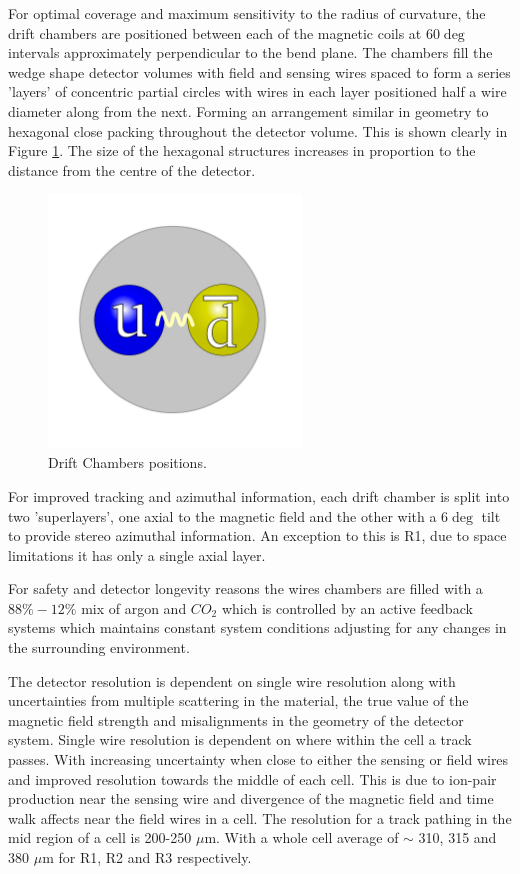 For optimal coverage and maximum sensitivity to the radius of curvature, the drift chambers are positioned between each of the magnetic coils at $60\deg$ intervals approximately perpendicular to the bend plane. The chambers fill the wedge shape detector volumes with field and sensing wires spaced to form a series 'layers' of concentric partial circles with wires in each layer positioned half a wire diameter along from the next. Forming an arrangement similar in geometry to hexagonal close packing throughout the detector volume. This is shown clearly in Figure \ref{CLASdriftwires}. The size of the hexagonal structures increases in proportion to the distance from the centre of the detector.

\begin{figure}
	\centering
	\includegraphics[width=0.6\textwidth]{ImgChap1/meson2}
	\caption{Drift Chambers positions.}
	\label{CLASdriftwires}
\end{figure}

For improved tracking and azimuthal information, each drift chamber is split into two 'superlayers', one axial to the magnetic field and the other with a $6\deg$ tilt to provide stereo azimuthal information. An exception to this is R1, due to space limitations it has only a single axial layer. 

For safety and detector longevity reasons the wires chambers are filled with a $88\%-12\%$ mix of argon and $CO_{2}$ which is controlled by an active feedback systems which maintains constant system conditions adjusting for any changes in the surrounding environment. 

The detector resolution is dependent on single wire resolution along with uncertainties from multiple scattering in the material, the true value of the magnetic field strength and misalignments in the geometry of the detector system. Single wire resolution is dependent on where within the cell a track passes. With increasing uncertainty when close to either the sensing or field wires and improved resolution towards the middle of each cell. This is due to ion-pair production near the sensing wire and divergence of the magnetic field and time walk affects near the field wires in a cell. The resolution for a track pathing in the mid region of a cell is 200-250 $\mu$m. With a whole cell average of $\sim$ 310, 315 and 380 $\mu$m for R1, R2 and R3 respectively. \cite{mecking2003cebaf} 


